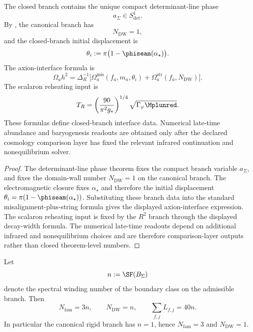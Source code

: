 \begin{theorem}
\label{thm:axion-seam-phase}
The closed branch contains the unique compact determinant-line phase
\[
a_\Sigma\in S^1_{\det}.
\]
By , the canonical branch has
\[
N_{\mathrm{DW}}=1,
\]
and the closed-branch initial displacement is
\[
\theta_i:=\pi\bigl(1-\phiseam(\alpha_\star)\bigr).
\]
The axion-interface formula is
\[
\Omega_a h^2=
\Delta_R^{-1}
\bigl[
\Omega_a^{\mathrm{mis}}(f_a,m_a,\theta_i)
+
\Omega_a^{\mathrm{str}}(f_a,N_{\mathrm{DW}})
\bigr].
\]
The scalaron reheating input is
\[
T_R=
\left(\frac{90}{\pi^2 g_\ast}\right)^{1/4}
\sqrt{\Gamma_\varphi \Mplunred}.
\]
These formulas define closed-branch interface data. Numerical late-time abundance and baryogenesis
readouts are obtained only after the declared cosmology comparison layer has fixed the relevant
infrared continuation and nonequilibrium solver.
\end{theorem}

\begin{proof}
The determinant-line phase theorem fixes the compact branch variable $a_\Sigma$, and
 fixes the domain-wall number $N_{\mathrm{DW}}=1$ on the
canonical branch. The electromagnetic closure fixes $\alpha_\star$ and therefore the initial
displacement $\theta_i=\pi(1-\phiseam(\alpha_\star))$. Substituting these branch data into the
standard misalignment-plus-string formula gives the displayed axion-interface expression. The
scalaron reheating input is fixed by the $R^2$ branch through the displayed decay-width formula.
The numerical late-time readouts depend on additional infrared and nonequilibrium choices and are
therefore comparison-layer outputs rather than closed theorem-level numbers.
\end{proof}

\begin{theorem}
\label{thm:boundary-winding-control}
Let
\[
n:=\SF(B_\Sigma)
\]
denote the spectral winding number of the boundary class on the admissible branch. Then
\[
N_{\mathrm{fam}}=3n,
\qquad
N_{\mathrm{DW}}=n,
\qquad
\sum_{f,j}L_{f,j}=40n.
\]
In particular the canonical rigid branch has $n=1$, hence $N_{\mathrm{fam}}=3$ and
$N_{\mathrm{DW}}=1$.
\end{theorem}

